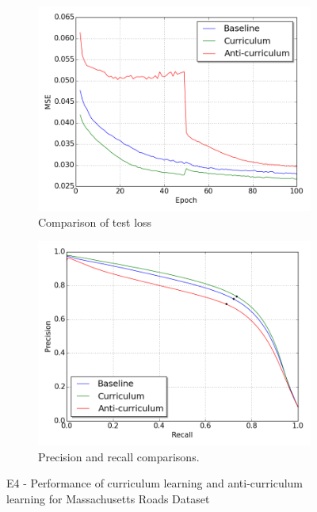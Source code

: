 \begin{figure}
\begin{subfigure}{0.5\textwidth}
\includegraphics[width=\linewidth]{figs/E4/E4-lc.png}
\caption{Comparison of test loss} \label{fig:E4_curr_mass_loss}
\end{subfigure}
\hspace*{\fill} %
\begin{subfigure}{0.5\textwidth}
\includegraphics[width=\linewidth]{figs/E4/E4-pr.png}
\caption{Precision and recall comparisons.} \label{fig:E4_curr_mass_pr}
\end{subfigure}
\hspace*{\fill} %
\caption[E4 - Performance of curriculum learning for Massachusetts Roads Dataset]{E4 - Performance of curriculum learning and anti-curriculum learning for Massachusetts Roads Dataset} \label{fig:E4_curriculum_mass}
\end{figure}

